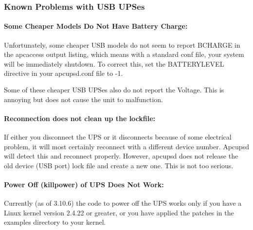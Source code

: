 {{{{\label{Known-Problems-with-USB-UPSes}

\subsubsection*{Known Problems with USB UPSes}

\label{index-Problems_002c-USB-103}

\label{Some-Cheaper-Models-Do-Not-Have-Battery-Charge}

\paragraph*{Some Cheaper Models Do Not Have Battery Charge:}

\label{index-Problems_002c-no-Battery-charge-104}
Unfortunately, some cheaper USB models do not seem to report BCHARGE in the
apcaccess output listing, which means with a standard conf file, your system
will be immediately shutdown. To correct this, set the BATTERYLEVEL directive
in your apcupsd.conf file to -1.  

Some of these cheaper USB UPSes also do not report the Voltage. This is
annoying but does not cause the unit to malfunction. 

\label{Reconnection-does-not-clean-up-the-lockfile}

\paragraph*{Reconnection does not clean up the lockfile:}

\label{index-Problems_002c-lock-file-not-cleaned-up-105}
If either you disconnect the UPS or it disconnects because of some electrical
problem, it will most certainly reconnect with a different device number.
Apcupsd will detect this and reconnect properly. However, apcupsd does not
release the old device (USB port) lock file and create a new one. This is not
too serious. 

\label{Power-Off-_005bkillpower_005d-of-UPS-Does-Not-Work}

\paragraph*{Power Off (killpower) of UPS Does Not Work:}

\label{index-Problems_002c-Power-off-106}
\label{index-Problems_002c-killpower-107}
Currently (as of 3.10.6) the code to power off the UPS works only if you have
a Linux kernel version 2.4.22 or greater, or you have applied the patches in
the examples directory to your kernel. 

}}}}
